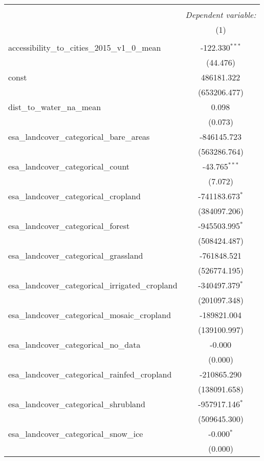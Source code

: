 \begin{table}[!htbp] \centering
\begin{tabular}{@{\extracolsep{5pt}}lc}
\\[-1.8ex]\hline
\hline \\[-1.8ex]
& \multicolumn{1}{c}{\textit{Dependent variable:}} \
\cr \cline{1-2}
\\[-1.8ex] & (1) \\
\hline \\[-1.8ex]
 accessibility_to_cities_2015_v1_0_mean & -122.330$^{***}$ \\
  & (44.476) \\
 const & 486181.322$^{}$ \\
  & (653206.477) \\
 dist_to_water_na_mean & 0.098$^{}$ \\
  & (0.073) \\
 esa_landcover_categorical_bare_areas & -846145.723$^{}$ \\
  & (563286.764) \\
 esa_landcover_categorical_count & -43.765$^{***}$ \\
  & (7.072) \\
 esa_landcover_categorical_cropland & -741183.673$^{*}$ \\
  & (384097.206) \\
 esa_landcover_categorical_forest & -945503.995$^{*}$ \\
  & (508424.487) \\
 esa_landcover_categorical_grassland & -761848.521$^{}$ \\
  & (526774.195) \\
 esa_landcover_categorical_irrigated_cropland & -340497.379$^{*}$ \\
  & (201097.348) \\
 esa_landcover_categorical_mosaic_cropland & -189821.004$^{}$ \\
  & (139100.997) \\
 esa_landcover_categorical_no_data & -0.000$^{}$ \\
  & (0.000) \\
 esa_landcover_categorical_rainfed_cropland & -210865.290$^{}$ \\
  & (138091.658) \\
 esa_landcover_categorical_shrubland & -957917.146$^{*}$ \\
  & (509645.300) \\
 esa_landcover_categorical_snow_ice & -0.000$^{*}$ \\
  & (0.000) \\

\end{tabular}
\end{table}
